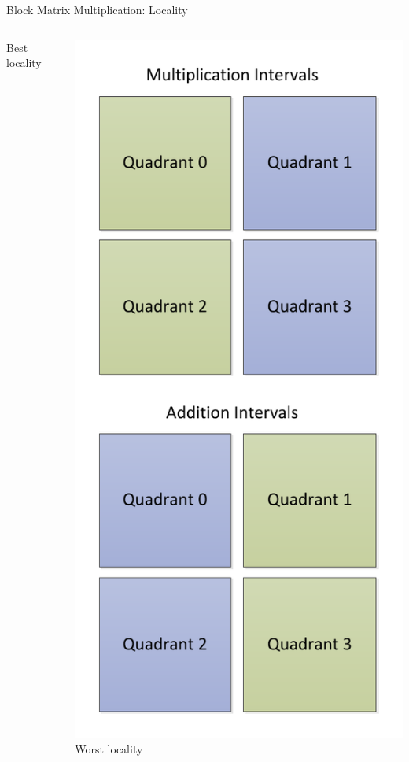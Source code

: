\begin{frame}{Block Matrix Multiplication: Locality}
\begin{columns}[c]
\begin{column}{0.31\textwidth}
\begin{center}
        \tiny{Best locality}
      \end{center}
    \end{column}
    \begin{column}{0.31\textwidth}
      \begin{center}
        \includegraphics[width=\linewidth]{figures/matmult-worst-locality} \\
        \tiny{Worst locality}
      \end{center}
    \end{column}
  \end{columns}
\end{frame}

